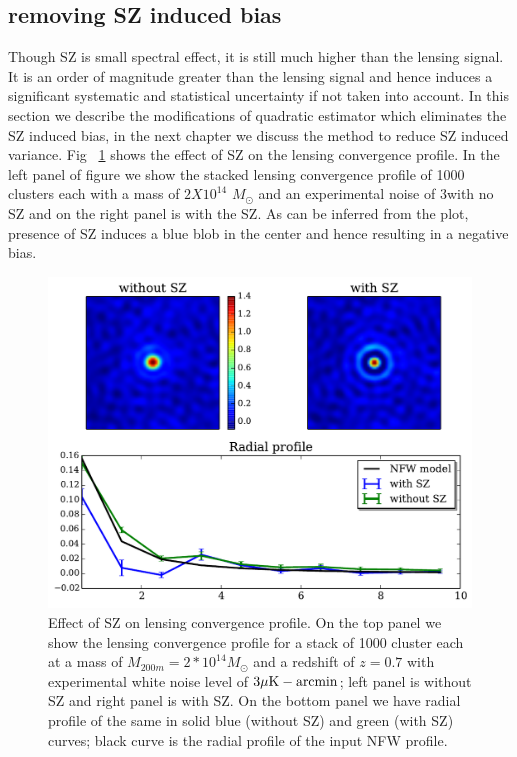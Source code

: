  
\subsection{removing SZ induced bias}
\label{sec_sz_induced_bias}
Though SZ is small spectral effect, it is still much higher than the lensing signal. 
 It is an order of magnitude greater than the lensing signal and hence induces a significant systematic and statistical uncertainty if not taken into account. 
In this section we describe the modifications of quadratic estimator which eliminates the SZ induced bias, in the next chapter we discuss the method to reduce SZ induced variance.
Fig ~\ref{fig:SZ_effect} shows the effect of SZ on the lensing convergence profile. 
 In the left panel of figure we show the stacked lensing convergence profile of 1000 clusters each with a mass of $2 X10^{14}$ $M_{\odot}$ and an experimental noise of 3\ukam with no SZ and on the right panel is with the SZ.  
 As can be inferred from the plot, presence of SZ induces a blue blob in the center and hence resulting in a negative bias.
 \begin{figure}[ht]
\includegraphics[width=\linewidth]{figs/tSZ_effect_on_lensing.pdf}
\caption{Effect of SZ on lensing convergence profile. On the top panel we show the lensing convergence profile for a stack of 1000 cluster each at a mass of $M_{200m}= 2*10^{14}  M_{\odot}$ and a redshift of $z = 0.7$ with experimental white noise level of $3\mu{\rm K-arcmin}$; left panel is without SZ and right panel is with SZ. On the bottom panel we have radial profile of the same in solid blue (without SZ) and green (with SZ) curves; black curve is the radial profile of the input NFW profile. }
\label{fig:SZ_effect}
\end{figure}

